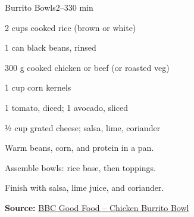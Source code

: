\begin{recipebox}{Burrito Bowls}{2--3}{30 min}
\begin{ingredients}
  \item 2 cups cooked rice (brown or white)
  \item 1 can black beans, rinsed
  \item 300 g cooked chicken or beef (or roasted veg)
  \item 1 cup corn kernels
  \item 1 tomato, diced; 1 avocado, sliced
  \item ½ cup grated cheese; salsa, lime, coriander
\end{ingredients}
\begin{method}
  \item Warm beans, corn, and protein in a pan.
  \item Assemble bowls: rice base, then toppings.
  \item Finish with salsa, lime juice, and coriander.
\end{method}
\textbf{Source:} \href{https://www.bbcgoodfood.com/recipes/chicken-burrito-bowl}{BBC Good Food – Chicken Burrito Bowl}
\end{recipebox}

